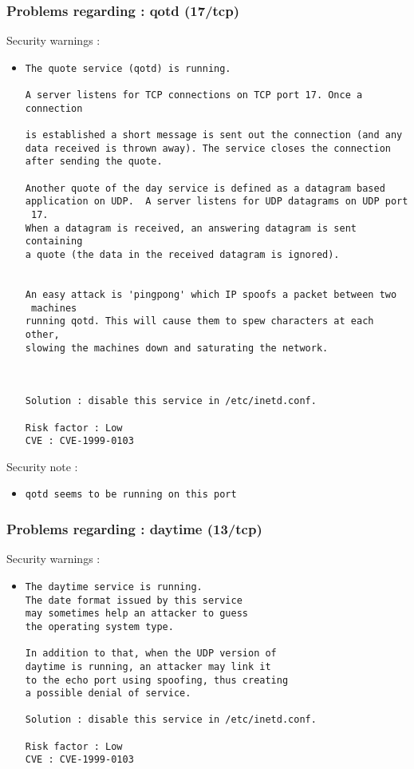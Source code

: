 \documentclass{article}
\begin{document}
\subsubsection{Problems regarding : qotd (17/tcp)}
Security warnings :\\
\begin{itemize}
\item \begin{verbatim}
The quote service (qotd) is running.

A server listens for TCP connections on TCP port 17. Once a connection
 
is established a short message is sent out the connection (and any 
data received is thrown away). The service closes the connection 
after sending the quote.

Another quote of the day service is defined as a datagram based
application on UDP.  A server listens for UDP datagrams on UDP port
 17.
When a datagram is received, an answering datagram is sent containing 
a quote (the data in the received datagram is ignored).


An easy attack is 'pingpong' which IP spoofs a packet between two
 machines
running qotd. This will cause them to spew characters at each other,
slowing the machines down and saturating the network.



Solution : disable this service in /etc/inetd.conf.

Risk factor : Low
CVE : CVE-1999-0103
\end{verbatim}\end{itemize}
Security note :\\
\begin{itemize}
\item \begin{verbatim}
qotd seems to be running on this port
\end{verbatim}\end{itemize}
\subsubsection{Problems regarding : daytime (13/tcp)}
Security warnings :\\
\begin{itemize}
\item \begin{verbatim}
The daytime service is running.
The date format issued by this service
may sometimes help an attacker to guess
the operating system type. 

In addition to that, when the UDP version of
daytime is running, an attacker may link it 
to the echo port using spoofing, thus creating
a possible denial of service.

Solution : disable this service in /etc/inetd.conf.

Risk factor : Low
CVE : CVE-1999-0103
\end{verbatim}\end{itemize}
\end{document}
